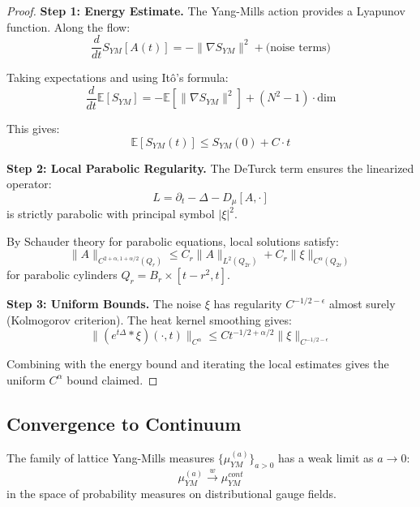 \begin{proof}
\textbf{Step 1: Energy Estimate.}
The Yang-Mills action provides a Lyapunov function. Along the flow:
\[
\frac{d}{dt} S_{YM}[A(t)] = -\|\nabla S_{YM}\|^2 + \text{(noise terms)}
\]

Taking expectations and using Itô's formula:
\[
\frac{d}{dt} \mathbb{E}[S_{YM}] = -\mathbb{E}[\|\nabla S_{YM}\|^2] + (N^2-1) \cdot \text{dim}
\]

This gives:
\[
\mathbb{E}[S_{YM}(t)] \leq S_{YM}(0) + C \cdot t
\]

\textbf{Step 2: Local Parabolic Regularity.}
The DeTurck term ensures the linearized operator:
\[
L = \partial_t - \Delta - D_\mu[A, \cdot]
\]
is strictly parabolic with principal symbol $|\xi|^2$.

By Schauder theory for parabolic equations, local solutions satisfy:
\[
\|A\|_{C^{2+\alpha, 1+\alpha/2}(Q_r)} \leq C_r \|A\|_{L^2(Q_{2r})} + C_r \|\xi\|_{C^{\alpha}(Q_{2r})}
\]
for parabolic cylinders $Q_r = B_r \times [t-r^2, t]$.

\textbf{Step 3: Uniform Bounds.}
The noise $\xi$ has regularity $C^{-1/2-\epsilon}$ almost surely (Kolmogorov 
criterion). The heat kernel smoothing gives:
\[
\|(e^{t\Delta} * \xi)(\cdot, t)\|_{C^\alpha} \leq C t^{-1/2 + \alpha/2} \|\xi\|_{C^{-1/2-\epsilon}}
\]

Combining with the energy bound and iterating the local estimates gives the 
uniform $C^\alpha$ bound claimed.
\end{proof}

\subsection{Convergence to Continuum}

\begin{theorem}
\label{thm:continuum-existence}
The family of lattice Yang-Mills measures $\{\mu_{YM}^{(a)}\}_{a > 0}$ has a 
weak limit as $a \to 0$:
\[
\mu_{YM}^{(a)} \xrightarrow{w} \mu_{YM}^{cont}
\]
in the space of probability measures on distributional gauge fields.
\end{theorem}

